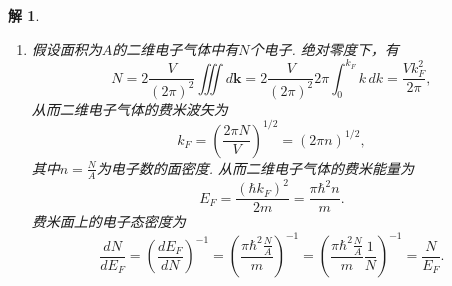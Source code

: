 \documentclass[UTF8,10pt,a4paper]{article}
\theoremstyle{Problem}
\theoremstyle{Solution}
\newtheorem*{sol}{解}
\begin{document}
\begin{sol}
\begin{enumerate}
\begin{equation}
            E_F=\frac{\hbar^2\left(3\pi^2\frac{N_A\rho}{M}\right)^{2/3}}{2m}=\frac{\left(\frac{6.63\times 10^{-34}}{2\pi}\right)^2\left(3\pi^2\times\frac{6.02\times 10^{23}\times1\times 10^3}{23\times 10^{-3}}\right)^{2/3}}{2\times 9.11\times 10^{-31}}\text{J}=5.2\times 10^{-19}\text{J}=3.2e\text{V}.
        \end{equation}
        \item[(d)] 假设面积为$A$的二维电子气体中有$N$个电子. 绝对零度下，有
        \begin{equation}
            N=2\frac{V}{(2\pi)^2}\iiint d\bm{k}=2\frac{V}{(2\pi)^2}2\pi\int_0^{k_F}k\,dk=\frac{Vk_F^2}{2\pi},
        \end{equation}
        从而二维电子气体的费米波矢为
        \begin{equation}
            k_F=\left(\frac{2\pi N}{V}\right)^{1/2}=(2\pi n)^{1/2},
        \end{equation}
        其中$n=\frac{N}{A}$为电子数的面密度.
        从而二维电子气体的费米能量为
        \begin{equation}
            E_F=\frac{(\hbar k_F)^2}{2m}=\frac{\pi\hbar^2n}{m}.
        \end{equation}
        费米面上的电子态密度为
        \begin{equation}
            \frac{dN}{dE_F}=\left(\frac{dE_F}{dN}\right)^{-1}=\left(\frac{\pi\hbar^2\frac{N}{A}}{m}\right)^{-1}=\left(\frac{\pi\hbar^2\frac{N}{A}}{m}\frac{1}{N}\right)^{-1}=\frac{N}{E_F}.
        \end{equation}
    \end{enumerate}
\end{sol}
\end{document}
